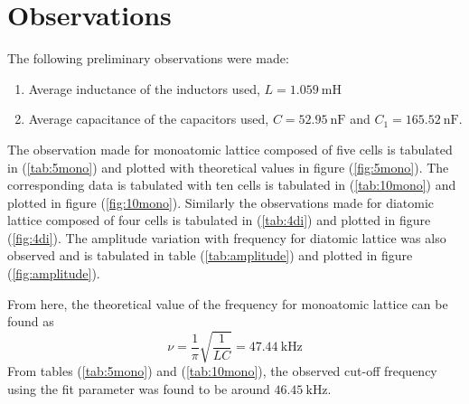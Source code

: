 \documentclass[%
 aip,
 amsmath,amssymb,
 reprint, floatfix%
]{revtex4-1}
\begin{document}
\section{Observations}
    The following preliminary observations were made:
    \begin{enumerate}
        \item Average inductance of the inductors used, $L = \SI{1.059}{\milli \henry}$
        \item  Average capacitance of the capacitors used, $C = \SI{52.95}{\nano \farad}$ and $C_1 = \SI{165.52}{\nano \farad}$.
    \end{enumerate}
    \par
    The observation made for monoatomic lattice composed of five cells is tabulated in (\ref{tab:5mono}) and plotted with theoretical values in figure (\ref{fig:5mono}). The corresponding data is tabulated with ten cells is tabulated in (\ref{tab:10mono}) and plotted in figure (\ref{fig:10mono}). Similarly the observations made for diatomic lattice composed of four cells is tabulated in (\ref{tab:4di}) and plotted in figure (\ref{fig:4di}). The amplitude variation with frequency for diatomic lattice was also observed and is tabulated in table (\ref{tab:amplitude}) and plotted in figure (\ref{fig:amplitude}).
    \par
    From here, the theoretical value of the frequency for monoatomic lattice can be found as
    \begin{equation}
        \nu = \dfrac{1}{\pi} \sqrt{\dfrac{1}{LC}} = \SI{47.44}{\kilo \hertz}
    \end{equation}
    From tables (\ref{tab:5mono}) and (\ref{tab:10mono}), the observed cut-off frequency using the fit parameter was found to be around  $\SI{46.45}{\kilo \hertz}$.
\end{document}
